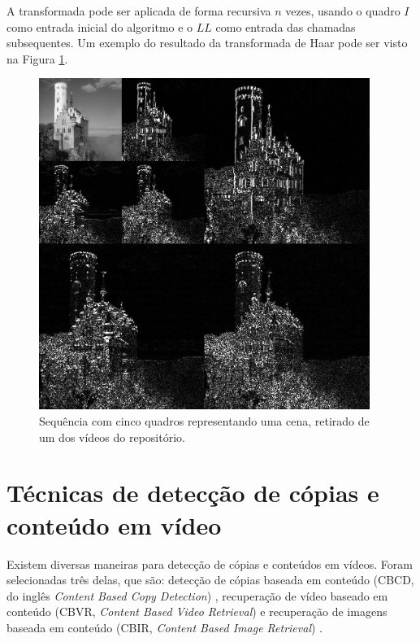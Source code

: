 A transformada pode ser aplicada de forma recursiva $n$ vezes, usando o quadro $I$ como entrada inicial do algoritmo e o $LL$ como entrada das chamadas subsequentes. Um exemplo do resultado da transformada de Haar pode ser visto na Figura \ref{fig:transf_haar}.

 \begin{figure}[h]
      \centering
      \includegraphics[width=0.96\textwidth]{dados/figuras/haar.png}
      \caption{Sequência com cinco quadros representando uma cena, retirado de um dos vídeos do repositório.}
      \label{fig:transf_haar}
    \end{figure}  

\section{Técnicas de detecção de cópias e conteúdo em vídeo} 
     
     Existem diversas maneiras para detecção de cópias e conteúdos em vídeos. Foram selecionadas três delas, que são: detecção de cópias baseada em conteúdo (CBCD, do inglês \textit{Content Based Copy Detection}) \citeauthor{jiang2011pku}, recuperação de vídeo baseado em conteúdo (CBVR, \textit{Content Based Video Retrieval}) \citeauthor{law2007video} e recuperação de imagens baseada em conteúdo (CBIR, \textit{Content Based Image Retrieval}) \citeauthor{gudivada1995content}.
     
